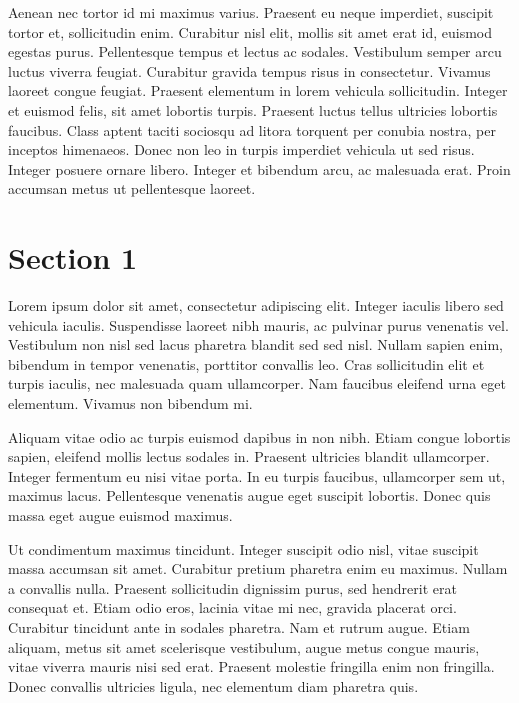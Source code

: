 \documentclass[12pt, english]{article}
\let\stdsection\section
\renewcommand\section{\newpage\stdsection}
\begin{document}
Aenean nec tortor id mi maximus varius. Praesent eu neque imperdiet, suscipit tortor et, sollicitudin enim. Curabitur nisl elit, mollis sit amet erat id, euismod egestas purus. Pellentesque tempus et lectus ac sodales. Vestibulum semper arcu luctus viverra feugiat. Curabitur gravida tempus risus in consectetur. Vivamus laoreet congue feugiat. Praesent elementum in lorem vehicula sollicitudin. Integer et euismod felis, sit amet lobortis turpis. Praesent luctus tellus ultricies lobortis faucibus. Class aptent taciti sociosqu ad litora torquent per conubia nostra, per inceptos himenaeos. Donec non leo in turpis imperdiet vehicula ut sed risus. Integer posuere ornare libero. Integer et bibendum arcu, ac malesuada erat. Proin accumsan metus ut pellentesque laoreet. 

\section{Section 1}

Lorem ipsum dolor sit amet, consectetur adipiscing elit. Integer iaculis libero sed vehicula iaculis. Suspendisse laoreet nibh mauris, ac pulvinar purus venenatis vel. Vestibulum non nisl sed lacus pharetra blandit sed sed nisl. Nullam sapien enim, bibendum in tempor venenatis, porttitor convallis leo. Cras sollicitudin elit et turpis iaculis, nec malesuada quam ullamcorper. Nam faucibus eleifend urna eget elementum. Vivamus non bibendum mi.

Aliquam vitae odio ac turpis euismod dapibus in non nibh. Etiam congue lobortis sapien, eleifend mollis lectus sodales in. Praesent ultricies blandit ullamcorper. Integer fermentum eu nisi vitae porta. In eu turpis faucibus, ullamcorper sem ut, maximus lacus. Pellentesque venenatis augue eget suscipit lobortis. Donec quis massa eget augue euismod maximus.

Ut condimentum maximus tincidunt. Integer suscipit odio nisl, vitae suscipit massa accumsan sit amet. Curabitur pretium pharetra enim eu maximus. Nullam a convallis nulla. Praesent sollicitudin dignissim purus, sed hendrerit erat consequat et. Etiam odio eros, lacinia vitae mi nec, gravida placerat orci. Curabitur tincidunt ante in sodales pharetra. Nam et rutrum augue. Etiam aliquam, metus sit amet scelerisque vestibulum, augue metus congue mauris, vitae viverra mauris nisi sed erat. Praesent molestie fringilla enim non fringilla. Donec convallis ultricies ligula, nec elementum diam pharetra quis.
\end{document}
